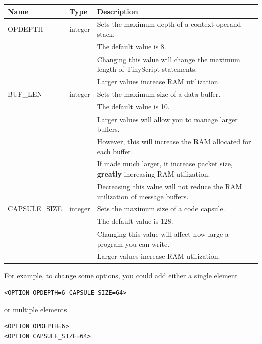 \documentclass[12pt]{article}
\begin{document}
\vspace{1ex}
{\scriptsize
\begin{tabular}{|l|l|l|}\hline
Name  & Type & Description \\ \hline
OPDEPTH      & integer & Sets the maximum depth of a context operand stack. \\
             &         & The default value is 8.\\
             &         & Changing this value will change the maximum length of  TinyScript statements.\\
             &         & Larger values increase RAM utilization.\\\hline
BUF\_LEN      & integer & Sets the maximum size of a data buffer.\\
             &         & The default value is 10.\\
	     &         & Larger values will allow you to manage larger buffers. \\
             &         & However, this will increase the RAM allocated for each buffer.\\
             &         & If made much larger, it increase packet size, {\bf greatly} increasing RAM utilization.\\
             &         & Decreasing this value will not reduce the RAM utilization of message buffers.\\ \hline
CAPSULE\_SIZE & integer & Sets the maximum size of a code capsule.\\
             &         & The default value is 128.\\
             &         & Changing this value will affect how large a program you can write.\\
             &         & Larger values increase RAM utilization.\\ \hline
\end{tabular}
}
\vspace{1ex}

For example, to change some options, you could add either a single element

\begin{verbatim}
<OPTION OPDEPTH=6 CAPSULE_SIZE=64>
\end{verbatim}

or multiple elements

\begin{verbatim}
<OPTION OPDEPTH=6>
<OPTION CAPSULE_SIZE=64>
\end{verbatim}
\end{document}
